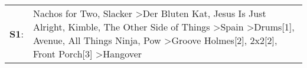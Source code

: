 \begin{supertabular}{p{0.03\textwidth}p{0.92\textwidth}}
 \textbf{S1}:  &  Nachos for Two\textsuperscript{}, \enspace Slacker\textsuperscript{} \textgreater \enspace Der Bluten Kat\textsuperscript{}, \enspace Jesus Is Just Alright\textsuperscript{}, \enspace Kimble\textsuperscript{}, \enspace The Other Side of Things\textsuperscript{} \textgreater \enspace Spain\textsuperscript{} \textgreater \enspace Drums[1]\textsuperscript{}, \enspace Avenue\textsuperscript{}, \enspace All Things Ninja\textsuperscript{}, \enspace Pow\textsuperscript{} \textgreater \enspace Groove Holmes[2]\textsuperscript{}, \enspace 2x2[2]\textsuperscript{}, \enspace Front Porch[3]\textsuperscript{} \textgreater \enspace Hangover\textsuperscript{}  \enspace  \\
\end{supertabular}
